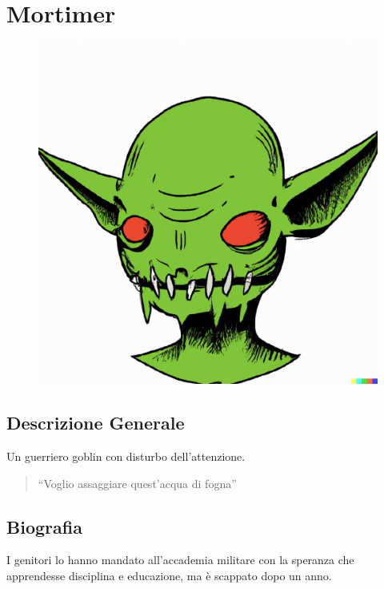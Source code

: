 \section{Mortimer}\label{mortimer}


\begin{figure}
\centering
\includegraphics{Mortimer.png}
\end{figure}

\subsection{Descrizione Generale}\label{descrizione-generale}



Un guerriero goblin con disturbo dell'attenzione.

\begin{quote}
``Voglio assaggiare quest'acqua di fogna''
\end{quote}

\subsection{Biografia}\label{biografia}



I genitori lo hanno mandato all'accademia militare con la speranza che
apprendesse disciplina e educazione, ma è scappato dopo un anno.

